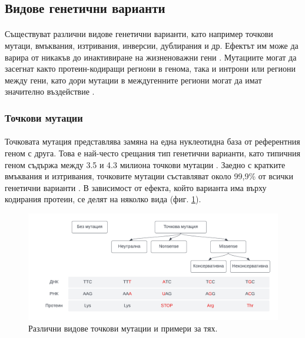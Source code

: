 \documentclass[pdftex,cyrillic,14pt,a4page,twoside,openright]{extreport}
\begin{document}
\subsection[Видове генетични варианти]{Видове генетични варианти}
\paragraph{}
Съществуват различни видове генетични варианти, като например точкови мутаци, вмъквания, изтривания, инверсии, дублирания и др. Ефектът им може да варира от никакъв до инактивиране на жизненоважни гени \cite{taiping1998}. Мутациите могат да засегнат както протеин-кодиращи региони в генома, така и интрони или региони между гени, като дори мутации в междугенните региони могат да имат значително въздействие \cite{zou2020}.

\subsubsection{Точкови мутации}
\paragraph{}
Точковата мутация представлява замяна на една нуклеотидна база от референтния геном с друга. Това е най-често срещания тип генетични варианти, като типичния геном съдържа между 3.5 и 4.3 милиона точкови мутации . Заедно с кратките вмъквания и изтривания, точковите мутации съставляват около 99,9\% от всички генетични варианти \cite{auton2015}. В зависимост от ефекта, който варианта има върху кодирания протеин, се делят на няколко вида (фиг. \ref{fig:snp_types}).

\begin{figure}[h]
  \centering
  \includegraphics[width=17cm]{figures/snp_types}
  \caption {Различни видове точкови мутации и примери за тях.}
  \label{fig:snp_types}
\end{figure}
\end{document}
